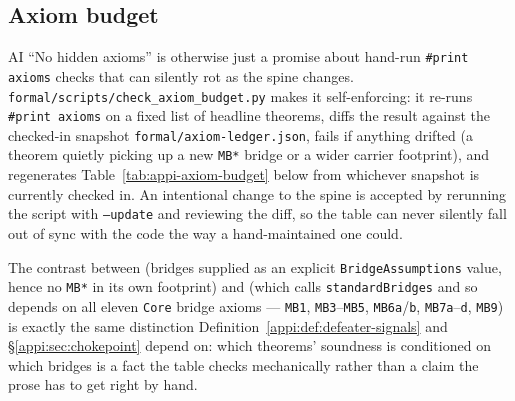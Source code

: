 \subsection{Axiom budget}
\label{appi:sec:axiom-budget}
\begin{authbar}{AI}
``No hidden axioms'' is otherwise just a promise about hand-run \texttt{\#print axioms} checks that can silently rot as the spine changes. \texttt{formal/scripts/check\_axiom\_budget.py} makes it self-enforcing: it re-runs \texttt{\#print axioms} on a fixed list of headline theorems, diffs the result against the checked-in snapshot \texttt{formal/axiom-ledger.json}, fails if anything drifted (a theorem quietly picking up a new \texttt{MB*} bridge or a wider carrier footprint), and regenerates Table~\ref{tab:appi-axiom-budget} below from whichever snapshot is currently checked in. An intentional change to the spine is accepted by rerunning the script with \texttt{--update} and reviewing the diff, so the table can never silently fall out of sync with the code the way a hand-maintained one could.



The contrast between  (bridges supplied as an explicit \texttt{BridgeAssumptions} value, hence no \texttt{MB*} in its own footprint) and  (which calls \texttt{standardBridges} and so depends on all eleven \texttt{Core} bridge axioms --- \texttt{MB1}, \texttt{MB3}--\texttt{MB5}, \texttt{MB6a}/\texttt{b}, \texttt{MB7a}--\texttt{d}, \texttt{MB9}) is exactly the same distinction Definition~\ref{appi:def:defeater-signals} and \S\ref{appi:sec:chokepoint} depend on: which theorems' soundness is conditioned on which bridges is a fact the table checks mechanically rather than a claim the prose has to get right by hand.

\end{authbar}
\authbarsubneedspace
